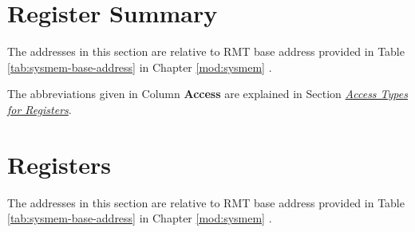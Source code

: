 \documentclass[main\_\_EN.tex]{subfiles}
\begin{document}


\hypertarget{rmt-reg-summ}{}
\section{Register Summary}
\label{sec:rmt-reg-summ}

The addresses in this section are relative to RMT base address provided in Table  \ref{tab:sysmem-base-address} in Chapter \ref{mod:sysmem} \textit{} .

The abbreviations given in Column \textbf{Access} are explained in Section \hyperref[glossary-access-types]{\textit{Access Types for Registers}}.






\clearpage
\section{Registers}

The addresses in this section are relative to RMT base address provided in Table \ref{tab:sysmem-base-address} in Chapter \ref{mod:sysmem} \textit{}.


\end{document}

